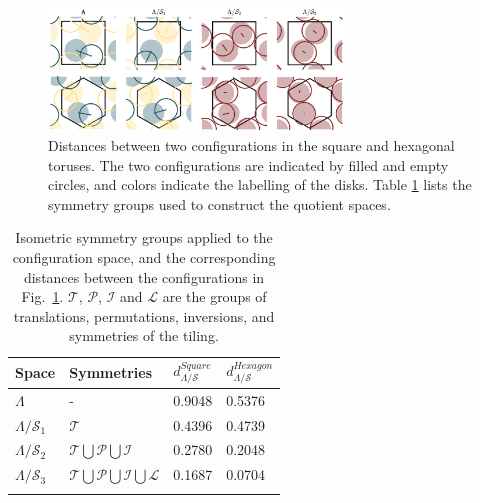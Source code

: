 \documentclass[default,iicol]{sn-jnl}%
\theoremstyle{thmstyleone}%
\theoremstyle{thmstyletwo}%
\theoremstyle{thmstylethree}%
\begin{document}
\begin{figure}
	\centering
	\includegraphics[width=0.7\textwidth]{figure4.png}
	\caption{Distances between two configurations in the square and hexagonal toruses. The two configurations are indicated by filled and empty circles, and colors indicate the labelling of the disks. Table \ref{table:symmetries} lists the symmetry groups used to construct the quotient spaces.}
	\label{fig:figure4}
\end{figure}

\begin{table}[h]
	\begin{center}
		\begin{minipage}{174pt}
			\caption{\label{table:symmetries}Isometric symmetry groups applied to the configuration space, and the corresponding distances between the configurations in Fig.\ \ref{fig:figure4}. $\mathcal{T}$, $\mathcal{P}$, $\mathcal{I}$ and $\mathcal{L}$ are the groups of translations, permutations, inversions, and symmetries of the tiling.}
			\begin{tabular}{@{}llll@{}}
				\toprule
				Space&Symmetries&$d_{\Lambda/\mathcal{S}}^{Square}$&$d_{\Lambda/\mathcal{S}}^{Hexagon}$\\
				\midrule
				$\Lambda$               & -             & 0.9048 & 0.5376 \\ 
				$\Lambda/\mathcal{S}_1$ & $\mathcal{T}$  & 0.4396 & 0.4739\\ 
				$\Lambda/\mathcal{S}_2$ & $\mathcal{T} \bigcup \mathcal{P} \bigcup \mathcal{I}$ & 0.2780 & 0.2048\\
				$\Lambda/\mathcal{S}_3$ & $\mathcal{T} \bigcup \mathcal{P} \bigcup \mathcal{I} \bigcup \mathcal{L}$ & 0.1687 & 0.0704\\
				\botrule
			\end{tabular}
		\end{minipage}
	\end{center}
\end{table}
\end{document}
